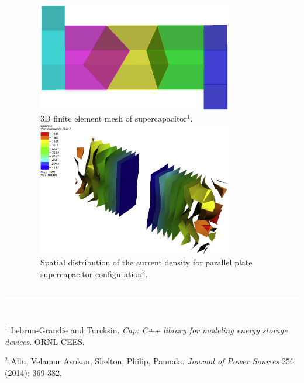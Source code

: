 \documentclass[8pt]{beamer}
\begin{document}
\begin{frame}
\begin{columns}
\begin{column}{.50\textwidth}
\begin{block}{}
\end{block}
\end{column}
\begin{column}{.42\textwidth}
\begin{center}
\begin{figure}[h]
    \centering
    \includegraphics[trim = 0in 0in 0in 0in, clip, width=0.8\textwidth]{figs_report/transparent.png} 
    \\{3D finite element mesh of supercapacitor$^1$.}\\
    \includegraphics[trim = 0in 0in 0in 0in, clip, width=0.8\textwidth]{figs_report/parallel_conf.png}
    \\ {Spatial distribution of the current density for parallel plate supercapacitor configuration$^2$.}
\end{figure}
\end{center}
\end{column}
\end{columns}

\vspace{0.1in}
\noindent\rule{5cm}{0.4pt}\\
\begin{footnotesize}
$^1$ Lebrun-Grandie and Turcksin. \textit{Cap: C++ library for modeling energy storage devices}. ORNL-CEES.

$^2$ Allu, Velamur Asokan, Shelton, Philip, Pannala. \textit{Journal of Power Sources} 256 (2014): 369-382.
\end{footnotesize}

\vfill
\end{frame}
\end{document}
